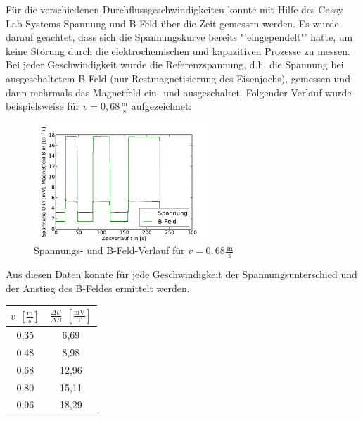\documentclass[11pt]{scrartcl}
\newcommand{\unit}[1]{\ensuremath{\,\mathrm{#1}}} %
\begin{document}
Für die verschiedenen Durchflussgeschwindigkeiten konnte mit Hilfe des Cassy Lab Systems Spannung und B-Feld über die Zeit gemessen werden. Es wurde darauf geachtet, dass sich die Spannungskurve bereits "'eingependelt"' hatte, um keine Störung durch die elektrochemischen und kapazitiven Prozesse zu messen.
Bei jeder Geschwindigkeit wurde die Referenzspannung, d.h. die Spannung bei ausgeschaltetem B-Feld (nur Restmagnetisierung des Eisenjochs), gemessen und dann mehrmals das Magnetfeld ein- und ausgeschaltet.
Folgender Verlauf wurde beispielsweise für $v=0,68\frac{\unit{m}}{\unit{s}}$ aufgezeichnet:


\begin{figure}[H]
\begin{center}
\includegraphics[width=0.59\textwidth]{images/U-B-068.pdf}
\end{center}
\vspace{-1.5\baselineskip}
\caption{Spannungs- und B-Feld-Verlauf für $v=0,68\frac{\unit{m}}{\unit{s}}$}
\label{U-B-068}
\end{figure}

Aus diesen Daten konnte für jede Geschwindigkeit der Spannungsunterschied und der Anstieg des B-Feldes ermittelt werden. 

\begin{table}[ht]
\label{Geschwindigkeitstabelle}
\begin{center}\vspace{-\baselineskip}
\begin{tabular}{c|c}
$v\; \unit{[\frac{m}{s}]}$ &
$\frac{\Delta U}{\Delta B}\; \unit{[\frac{mV}{T}]}$ \\
\hline
0,35	& 6,69 \\
0,48	& 8,98 \\
0,68	& 12,96 \\
0,80	& 15,11 \\
0,96	& 18,29
\end{tabular}
\vspace{-\baselineskip}\end{center}
\end{table}
\end{document}
